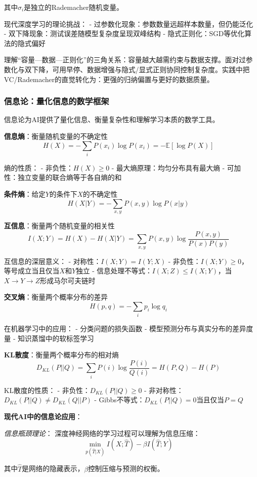 其中$\sigma_i$是独立的Rademacher随机变量。

现代深度学习的理论挑战：
- 过参数化现象：参数数量远超样本数量，但仍能泛化
- 双下降现象：测试误差随模型复杂度呈现双峰结构
- 隐式正则化：SGD等优化算法的隐式偏好

理解“容量—数据—正则化”的三角关系：容量越大越需约束与数据支撑。面对过参数化与双下降，可用早停、数据增强与隐式/显式正则协同控制复杂度。实践中把VC/Rademacher的直觉转化为：更强的归纳偏置与更好的数据质量。

\subsubsection{信息论：量化信息的数学框架}

信息论为AI提供了量化信息、衡量复杂性和理解学习本质的数学工具。

\textbf{信息熵}：衡量随机变量的不确定性
$$H(X) = -\sum_{i} P(x_i) \log P(x_i) = -\mathbb{E}[\log P(X)]$$

熵的性质：
- 非负性：$H(X) \geq 0$
- 最大熵原理：均匀分布具有最大熵
- 可加性：独立变量的联合熵等于各自熵的和

\textbf{条件熵}：给定$Y$的条件下$X$的不确定性
$$H(X|Y) = -\sum_{x,y} P(x,y) \log P(x|y)$$

\textbf{互信息}：衡量两个随机变量的相关性
$$I(X;Y) = H(X) - H(X|Y) = \sum_{x,y} P(x,y) \log \frac{P(x,y)}{P(x)P(y)}$$

互信息的深层意义：
- 对称性：$I(X;Y) = I(Y;X)$
- 非负性：$I(X;Y) \geq 0$，等号成立当且仅当$X$和$Y$独立
- 信息处理不等式：$I(X;Z) \leq I(X;Y)$，当$X \to Y \to Z$形成马尔可夫链时

\textbf{交叉熵}：衡量两个概率分布的差异
$$H(p,q) = -\sum_{i} p_i \log q_i$$

在机器学习中的应用：
- 分类问题的损失函数
- 模型预测分布与真实分布的差异度量
- 知识蒸馏中的软标签学习

\textbf{KL散度}：衡量两个概率分布的相对熵
$$D_{KL}(P||Q) = \sum_{i} P(i) \log \frac{P(i)}{Q(i)} = H(P,Q) - H(P)$$

KL散度的性质：
- 非负性：$D_{KL}(P||Q) \geq 0$
- 非对称性：$D_{KL}(P||Q) \neq D_{KL}(Q||P)$
- Gibbs不等式：$D_{KL}(P||Q) = 0$当且仅当$P = Q$

\textbf{现代AI中的信息论应用}：

\textit{信息瓶颈理论}：
深度神经网络的学习过程可以理解为信息压缩：
$$\min_{p(\hat{T}|X)} I(X; \hat{T}) - \beta I(\hat{T}; Y)$$

其中$\hat{T}$是网络的隐藏表示，$\beta$控制压缩与预测的权衡。

